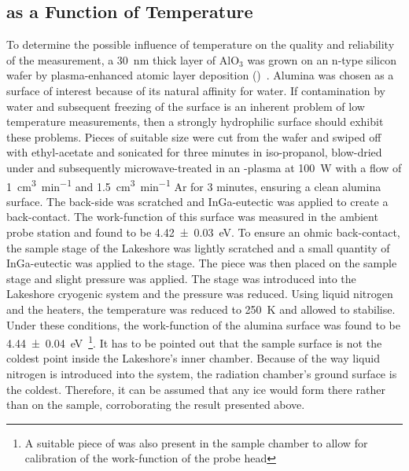 \subsection{\cpd{} as a Function of Temperature}
To determine the possible influence of temperature on the quality and reliability of the measurement, a \SI{30}{\nano\metre} thick layer of AlO$_3$ was grown on an n-type silicon wafer by plasma-enhanced atomic layer deposition (\peald{})~\cite{ann_inversion2}. Alumina was chosen as a surface of interest because of its natural affinity for water. If contamination by water and subsequent freezing of the surface is an inherent problem of low temperature \cpd{} measurements, then a strongly hydrophilic surface should exhibit these problems. Pieces of suitable size were cut from the wafer and swiped off with ethyl-acetate and sonicated for three minutes in iso-propanol, blow-dried under \nitro{} and subsequently microwave-treated in an \oxy{}-plasma at \SI{100}{\watt} with a flow of \SI{1}{\cubic\centi\metre\per\minute} \oxy{} and \SI{1.5}{\cubic\centi\metre\per\minute} Ar for 3 minutes, ensuring a clean alumina surface. The back-side was scratched and InGa-eutectic was applied to create a back-contact. The work-function of this surface was measured in the ambient probe station and found to be \SI{4.42+-0.03}{\electronvolt}. To ensure an ohmic back-contact, the sample stage of the Lakeshore was lightly scratched and a small quantity of InGa-eutectic was applied to the stage. The piece was then placed on the sample stage and slight pressure was applied. The stage was introduced into the Lakeshore cryogenic system and the pressure was reduced. Using liquid nitrogen and the heaters, the temperature was reduced to \SI{250}{\kelvin} and allowed to stabilise. Under these conditions, the work-function of the alumina surface was found to be \SI{4.44+-0.04}{\electronvolt}~\footnote{A suitable piece of \hopg{} was also present in the sample chamber to allow for calibration of the work-function of the probe head}. It has to be pointed out that the sample surface is not the coldest point inside the Lakeshore's inner chamber. Because of the way liquid nitrogen is introduced into the system, the radiation chamber's ground surface is the coldest. Therefore, it can be assumed that any ice would form there rather than on the sample, corroborating the result presented above.
